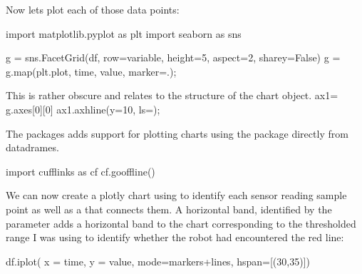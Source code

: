 \documentclass[letterpaper,10pt,english]{sphinxmanual}
\begin{document}
{Now lets plot each of those data points:

{
\begin{sphinxVerbatim}[commandchars=\\\{\}]
\llap{\color{nbsphinxin}[ ]:\,\hspace{\fboxrule}\hspace{\fboxsep}}import matplotlib.pyplot as plt
import seaborn as sns

g = sns.FacetGrid(df, row=\PYGZdq{}variable\PYGZdq{},
                  height=5, aspect=2, sharey=False)
g = g.map(plt.plot, \PYGZdq{}time\PYGZdq{}, \PYGZdq{}value\PYGZdq{}, marker=\PYGZdq{}.\PYGZdq{});

\PYGZsh{} This is rather obscure and relates to the structure
\PYGZsh{} of the chart object.
ax1= g.axes[0][0]
ax1.axhline(y=10, ls=\PYGZsq{}\PYGZhy{}\PYGZhy{}\PYGZsq{});
\end{sphinxVerbatim}
}

The  packages adds support for plotting charts using the  package directly from  datadrames.

{
\begin{sphinxVerbatim}[commandchars=\\\{\}]
\llap{\color{nbsphinxin}[ ]:\,\hspace{\fboxrule}\hspace{\fboxsep}}import cufflinks as cf
cf.go\PYGZus{}offline()
\end{sphinxVerbatim}
}

We can now create a plotly chart using  to identify each sensor reading sample point as well as a  that connects them. A horizontal band, identified by the  parameter adds a horizontal band to the chart corresponding to the thresholded range I was using to identify whether the robot had encountered the red line:

{
\begin{sphinxVerbatim}[commandchars=\\\{\}]
\llap{\color{nbsphinxin}[ ]:\,\hspace{\fboxrule}\hspace{\fboxsep}}df.iplot( x = \PYGZsq{}time\PYGZsq{}, y = \PYGZsq{}value\PYGZsq{},
         mode=\PYGZsq{}markers+lines\PYGZsq{}, hspan=[(30,35)])
\end{sphinxVerbatim}
}

}
\end{document}
